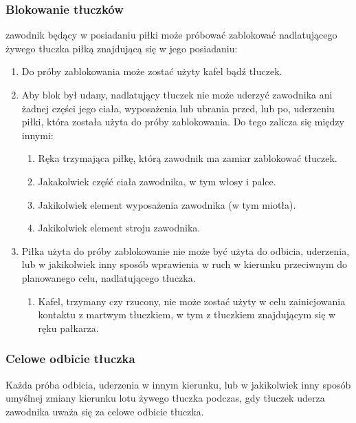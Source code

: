 \documentclass[12pt]{article}
\begin{document}
\subsubsection{Blokowanie tłuczków}

zawodnik będący w posiadaniu piłki może próbować zablokować
nadlatującego żywego tłuczka piłką znajdującą się w jego posiadaniu:

\begin{enumerate}
	\item
	      Do próby zablokowania może zostać użyty kafel bądź tłuczek.
	\item
	      Aby blok był udany, nadlatujący tłuczek nie może uderzyć zawodnika ani
	      żadnej części jego ciała, wyposażenia lub ubrania przed, lub po,
	      uderzeniu piłki, która została użyta do próby zablokowania. Do tego
	      zalicza się między innymi:

	      \begin{enumerate}
		      \item
		            Ręka trzymająca piłkę, którą zawodnik ma zamiar zablokować tłuczek.
		      \item
		            Jakakolwiek część ciała zawodnika, w tym włosy i palce.
		      \item
		            Jakikolwiek element wyposażenia zawodnika (w tym miotła).
		      \item
		            Jakikolwiek element stroju zawodnika.
	      \end{enumerate}
	\item
	      Piłka użyta do próby zablokowanie nie może być użyta do odbicia,
	      uderzenia, lub w jakikolwiek inny sposób wprawienia w ruch w kierunku
	      przeciwnym do planowanego celu, nadlatującego tłuczka.

	      \begin{enumerate}
		      \item
		            Kafel, trzymany czy rzucony, nie może zostać użyty w celu
		            zainicjowania kontaktu z martwym tłuczkiem, w tym z tłuczkiem
		            znajdującym się w ręku pałkarza.
	      \end{enumerate}
\end{enumerate}

\subsubsection{Celowe odbicie tłuczka}

Każda próba odbicia, uderzenia w innym kierunku, lub w jakikolwiek inny
sposób umyślnej zmiany kierunku lotu żywego tłuczka podczas, gdy tłuczek
uderza zawodnika uważa się za celowe odbicie tłuczka.
\end{document}
